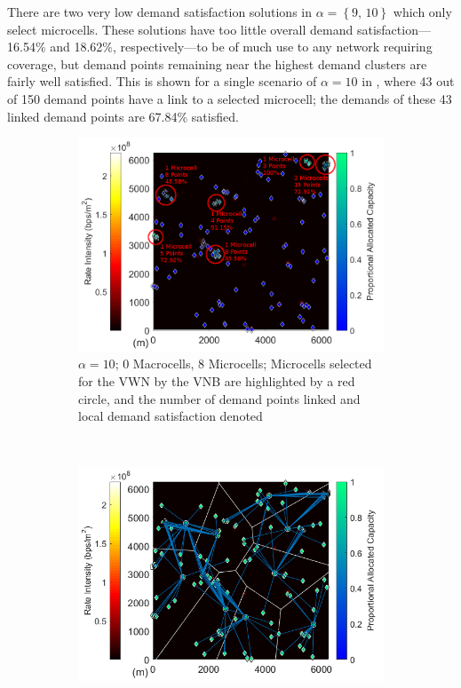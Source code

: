 \documentclass[12pt,dvipsnames]{report}
\begin{document}
There are two very low demand satisfaction solutions in $\alpha = \left\{ 9,\, 10 \right\}$ which only select microcells.  These solutions have too little overall demand satisfaction---16.54\% and 18.62\%, respectively---to be of much use to any network requiring coverage, but demand points remaining near the highest demand clusters are fairly well satisfied.  This is shown for a single scenario of $\alpha = 10$ in , where 43 out of 150 demand points have a link to a selected microcell; the demands of these 43 linked demand points are 67.84\% satisfied.

\begin{figure}[p]
	\centering
	\begin{subfigure}{.65\textwidth}
		\centering
		\includegraphics[width=1\linewidth]{Figures/CaseII_VoronoiDemandAllocation_sDEP_a10_denoted}
		\caption{\small $\alpha = 10$; 0 Macrocells, 8 Microcells; Microcells selected for the VWN by the VNB are highlighted by a red circle, and the number of demand points linked and local demand satisfaction denoted}
		\label{fig:CaseII_VoronoiDemandAllocation_sDEP_a10_denoted}
	\end{subfigure} \\
	\begin{subfigure}{.65\textwidth}
		\centering
		\includegraphics[width=1\linewidth]{CaseII_VoronoiDemandAllocation_sDEP_a100_snip2}

\end{subfigure}
\end{figure}
\end{document}
